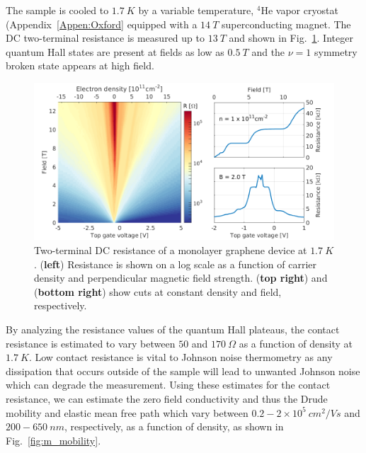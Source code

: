 The sample is cooled to $1.7~K$ by a variable temperature, $^4$He vapor cryostat (Appendix~\ref{Appen:Oxford} equipped with a $14~T$ superconducting magnet. The DC two-terminal resistance is measured up to $13~T$ and shown in Fig.~\ref{fig:m_Fan_R}. Integer quantum Hall states are present at fields as low as $0.5~T$ and the $\nu=1$ symmetry broken state appears at high field.
\begin{figure}
\centering
\includegraphics[width=\textwidth]{figures/magneto/Fan_R_cuts.png}
\caption{Two-terminal DC resistance of a monolayer graphene device at $1.7~K$. (\textbf{left}) Resistance is shown on a log scale as a function of carrier density and perpendicular magnetic field strength. (\textbf{top right}) and (\textbf{bottom right}) show cuts at constant density and field, respectively.}
\label{fig:m_Fan_R}
\end{figure}
By analyzing the resistance values of the quantum Hall plateaus, the contact resistance is estimated to vary between $50$ and $170~\Omega$ as a function of density at $1.7~K$. Low contact resistance is vital to Johnson noise thermometry as any dissipation that occurs outside of the sample will lead to unwanted Johnson noise which can degrade the measurement. Using these estimates for the contact resistance, we can estimate the zero field conductivity and thus the Drude mobility and elastic mean free path which vary between $0.2-2\times 10^5~cm^2/Vs$ and $200-650~nm$, respectively, as a function of density, as shown in Fig.~\ref{fig:m_mobility}.
